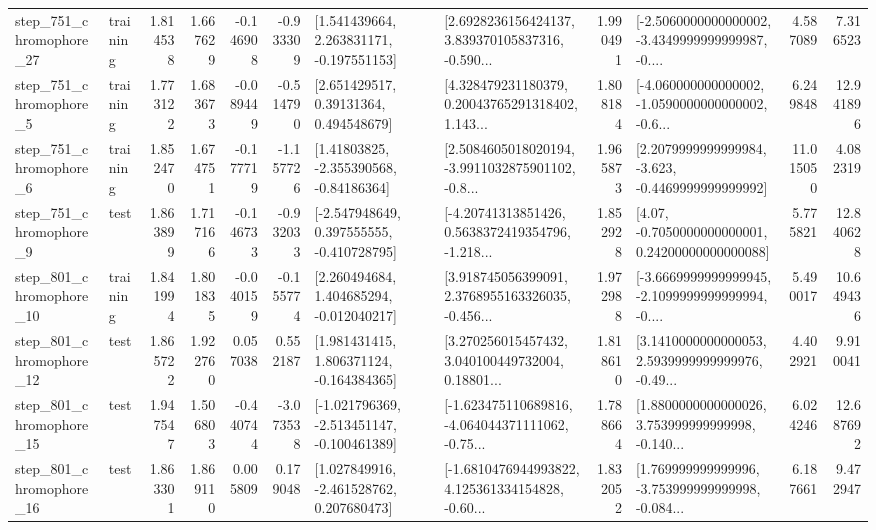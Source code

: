 \begin{tabular}{llrrrrllrlrr}
  step\_751\_chromophore\_27 &  training &      1.814538 &    1.667629 &     -0.146908 & -0.933309 &    [1.541439664, 2.263831171, -0.197551153] &  [2.6928236156424137, 3.839370105837316, -0.590... &       1.990491 &  [-2.5060000000000002, -3.4349999999999987, -0.... &            4.587089 &          7.316523 \\
   step\_751\_chromophore\_5 &  training &      1.773122 &    1.683673 &     -0.089449 & -0.514790 &      [2.651429517, 0.39131364, 0.494548679] &  [4.328479231180379, 0.20043765291318402, 1.143... &       1.808184 &  [-4.060000000000002, -1.0590000000000002, -0.6... &            6.249848 &         12.941896 \\
   step\_751\_chromophore\_6 &  training &      1.852470 &    1.674751 &     -0.177719 & -1.157726 &     [1.41803825, -2.355390568, -0.84186364] &  [2.5084605018020194, -3.9911032875901102, -0.8... &       1.965873 &  [2.2079999999999984, -3.623, -0.4469999999999992] &           11.015050 &          4.082319 \\
   step\_751\_chromophore\_9 &      test &      1.863899 &    1.717166 &     -0.146733 & -0.932033 &   [-2.547948649, 0.397555555, -0.410728795] &  [-4.20741313851426, 0.5638372419354796, -1.218... &       1.852928 &   [4.07, -0.7050000000000001, 0.24200000000000088] &            5.775821 &         12.840628 \\
  step\_801\_chromophore\_10 &  training &      1.841994 &    1.801835 &     -0.040159 & -0.155774 &    [2.260494684, 1.404685294, -0.012040217] &  [3.918745056399091, 2.3768955163326035, -0.456... &       1.972988 &  [-3.6669999999999945, -2.1099999999999994, -0.... &            5.490017 &         10.649436 \\
  step\_801\_chromophore\_12 &      test &      1.865722 &    1.922760 &      0.057038 &  0.552187 &    [1.981431415, 1.806371124, -0.164384365] &  [3.270256015457432, 3.040100449732004, 0.18801... &       1.818610 &  [3.1410000000000053, 2.5939999999999976, -0.49... &            4.402921 &          9.910041 \\
  step\_801\_chromophore\_15 &      test &      1.947547 &    1.506803 &     -0.440744 & -3.073538 &  [-1.021796369, -2.513451147, -0.100461389] &  [-1.623475110689816, -4.064044371111062, -0.75... &       1.788664 &  [1.8800000000000026, 3.753999999999998, -0.140... &            6.024246 &         12.687692 \\
  step\_801\_chromophore\_16 &      test &      1.863301 &    1.869110 &      0.005809 &  0.179048 &    [1.027849916, -2.461528762, 0.207680473] &  [-1.6810476944993822, 4.125361334154828, -0.60... &       1.832052 &  [1.769999999999996, -3.753999999999998, -0.084... &            6.187661 &          9.472947 \\

\end{tabular}
